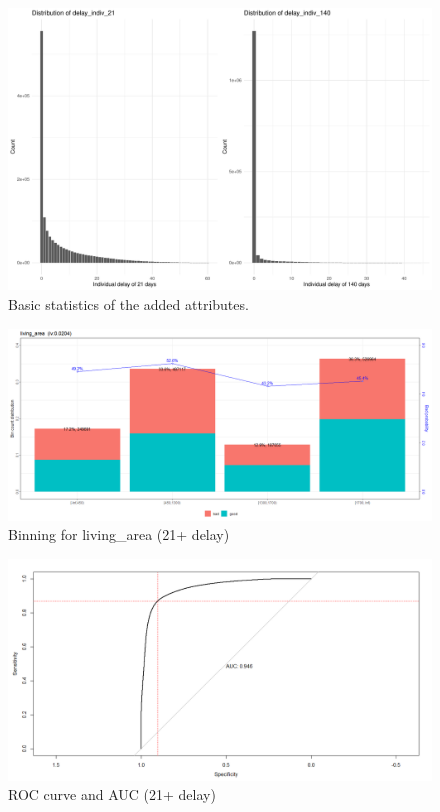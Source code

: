 \documentclass[
]{article}
\begin{document}
\begin{figure}
\includegraphics[height=0.4\textheight]{Documentation_Rmarkdown_files/figure-latex/statIndiv-1} \caption{\label{fig:stat-new}Basic statistics of the added attributes.}\label{fig:statIndiv}
\end{figure}

\begin{figure}
\centering
\includegraphics{.//WOE21.png}
\caption{\label{fig:woe21} Binning for living\_area (21+ delay)}
\end{figure}

\begin{figure}
\centering
\includegraphics{.//AUC21.png}
\caption{\label{fig:auc21} ROC curve and AUC (21+ delay)}
\end{figure}
\end{document}
